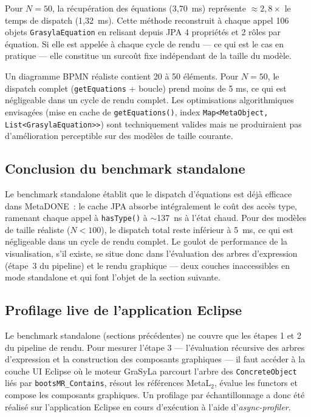 Pour $N = 50$, la récupération des équations (3,70~ms) représente
$\approx 2{,}8\times$ le temps de dispatch (1,32~ms). Cette méthode
reconstruit à chaque appel 106 objets \texttt{GrasylaEquation} en relisant
depuis JPA 4 propriétés et 2 rôles par équation. Si elle est appelée à
chaque cycle de rendu --- ce qui est le cas en pratique --- elle constitue
un surcoût fixe indépendant de la taille du modèle.

Un diagramme BPMN réaliste contient 20 à 50 éléments. Pour $N = 50$, le
dispatch complet (\texttt{getEquations} + boucle) prend moins de 5 ms, ce
qui est négligeable dans un cycle de rendu complet. Les optimisations
algorithmiques envisagées (mise en cache de \texttt{getEquations()}, index
\texttt{Map<MetaObject, List<GrasylaEquation>>}) sont techniquement valides
mais ne produiraient pas d'amélioration perceptible sur des modèles de
taille courante.

\subsection{Conclusion du benchmark standalone}

Le benchmark standalone établit que le dispatch d'équations est déjà efficace
dans MetaDONE~: le cache JPA absorbe intégralement le coût des accès type,
ramenant chaque appel à \texttt{hasType()} à $\sim$137~ns à l'état chaud.
Pour des modèles de taille réaliste ($N < 100$), le dispatch total reste
inférieur à 5~ms, ce qui est négligeable dans un cycle de rendu complet.
Le goulot de performance de la visualisation, s'il existe, se situe donc
dans l'évaluation des arbres d'expression (étape~3 du pipeline) et le rendu
graphique --- deux couches inaccessibles en mode standalone et qui font
l'objet de la section suivante.

\subsection{Profilage live de l'application Eclipse}
\label{sec:sc4-live}

Le benchmark standalone (sections précédentes) ne couvre que les étapes 1
et 2 du pipeline de rendu. Pour mesurer l'étape 3 --- l'évaluation
récursive des arbres d'expression et la construction des composants
graphiques --- il faut accéder à la couche UI Eclipse où le moteur GraSyLa
parcourt l'arbre des \texttt{ConcreteObject} liés par
\texttt{bootsMR\_Contains}, résout les références MetaL$_2$, évalue les
functors et compose les composants graphiques. Un profilage par
échantillonnage a donc été réalisé sur l'application Eclipse en cours
d'exécution à l'aide d'\emph{async-profiler}.

